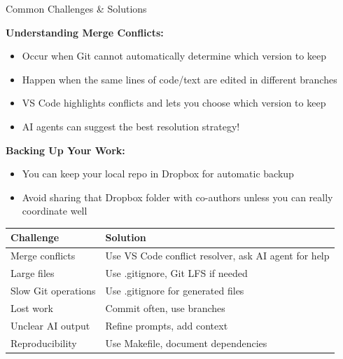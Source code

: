 \documentclass[11pt,aspectratio=169]{beamer}
\begin{document}
\begin{frame}{Common Challenges \& Solutions}

\textbf{Understanding Merge Conflicts:}
\begin{itemize}
    \item Occur when Git cannot automatically determine which version to keep
    \item Happen when the same lines of code/text are edited in different branches
    \item VS Code highlights conflicts and lets you choose which version to keep
    \item AI agents can suggest the best resolution strategy!
\end{itemize}

\vspace{0.2cm}

\textbf{Backing Up Your Work:}
\begin{itemize}
    \item You can keep your local repo in Dropbox for automatic backup
    \item Avoid sharing that Dropbox folder with co-authors unless you can really coordinate well
\end{itemize}

\vspace{0.2cm}

\begin{table}
\scriptsize
\begin{tabular}{lp{6.5cm}}
\toprule
\textbf{Challenge} & \textbf{Solution} \\
\midrule
Merge conflicts & Use VS Code conflict resolver, ask AI agent for help \\
Large files & Use .gitignore, Git LFS if needed \\
Slow Git operations & Use .gitignore for generated files \\
Lost work & Commit often, use branches \\
Unclear AI output & Refine prompts, add context \\
Reproducibility & Use Makefile, document dependencies \\
\bottomrule
\end{tabular}
\end{table}
\end{frame}
\end{document}
